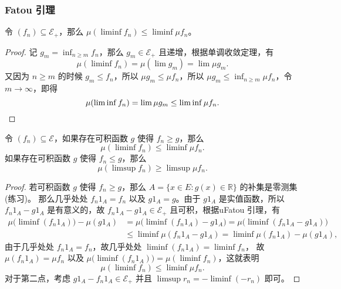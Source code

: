 \documentclass[fontset=none]{Notes}
\begin{document}
\subsubsection{Fatou 引理}

\begin{lemma}
  令 $(f_n)\subseteq \mathcal{E}_+$，那么 $\mu(\liminf f_n)\leq \liminf\mu f_n$。
\end{lemma}
\begin{proof}
  记 $g_m=\inf_{n\geq m}f_n$，那么 $g_m\in \mathcal{E}_+$ 且递增，根据单调收敛定理，有
  \[
    \mu(\liminf f_n)=\mu(\lim g_m)=\lim\mu g_m.
  \]
  又因为 $n\geq m$ 的时候 $g_m\leq f_n$，所以 $\mu g_m\leq \mu f_n$，所以
  $\mu g_m\leq \inf_{n\geq m} \mu f_n$，令 $m\to\infty$，即得
  \[
    \mu(\liminf f_n)=\lim\mu g_m\leq \liminf \mu f_n.\qedhere
  \]
\end{proof}

\begin{corollary}
  令 $(f_n)\subseteq \mathcal{E}$，如果存在可积函数 $g$ 使得 $f_n\geq g$，那么
  \[
    \mu(\liminf f_n)\leq\liminf \mu f_n.
  \]
  如果存在可积函数 $g$ 使得 $f_n\leq g$，那么
  \[
    \mu(\limsup f_n)\geq \limsup \mu f_n.
  \]
\end{corollary}
\begin{proof}
  若可积函数 $g$ 使得 $f_n\geq g$，那么 $A=\{x\in E:g(x)\in \mathbb{R}\}$ 的补集是零测集(练习)。
  那么几乎处处 $f_n1_A=f_n$ 以及 $g1_A=g$。由于 $g1_A$ 是实值函数，所以
  $f_n1_A-g1_A$ 是有意义的，故 $f_n1_A-g1_A\in \mathcal{E}_+$ 且可积，根据uFatou 引理，有
  \begin{align*}
    \mu\bigl(\liminf (f_n1_A)\bigr)-\mu(g1_A)&=\mu\bigl(\liminf (f_n1_A)- g1_A\bigr)
    =\mu\bigl(\liminf (f_n1_A-g1_A)\bigr)\\
    &\leq \liminf\mu(f_n1_A-g1_A)=\liminf \mu(f_n1_A)-\mu(g1_A),
  \end{align*}
  由于几乎处处 $f_n1_A=f_n$，故几乎处处 $\liminf (f_n1_A)=\liminf f_n$，
  故 $\mu(f_n1_A)=\mu f_n$ 以及 $\mu\bigl(\liminf (f_n1_A)\bigr)=\mu(\liminf f_n)$，这就表明
  \[
    \mu(\liminf f_n)\leq\liminf \mu f_n.
  \]
  对于第二点，考虑 $g1_A-f_n1_A\in \mathcal{E}_+$ 并且 $\limsup r_n=-\liminf(-r_n)$ 即可。
\end{proof}
\end{document}
